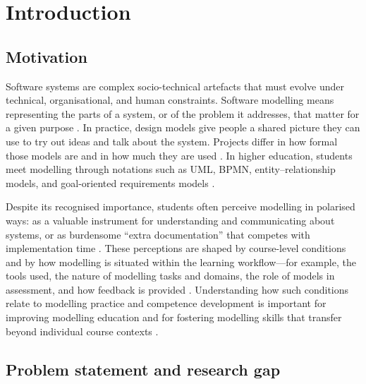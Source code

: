 
%

\chapter{Introduction}
\label{cha:introduction}

\section{Motivation}
\label{sec:intro_motivation}

Software systems are complex socio-technical artefacts that must evolve under technical, organisational, and human constraints. Software modelling means representing the parts of a system, or of the problem it addresses, that matter for a given purpose \cite{kuhne:DagSemProc.04101.15}. In practice, design models give people a shared picture they can use to try out ideas and talk about the system. Projects differ in how formal those models are and in how much they are used \cite{gorschek2014design,petre2013uml}. In higher education, students meet modelling through notations such as UML, BPMN, entity--relationship models, and goal-oriented requirements models \cite{istar-learning,bpmn-education,maslov2025conceptual}.

Despite its recognised importance, students often perceive modelling in polarised ways: as a valuable instrument for understanding and communicating about systems, or as burdensome ``extra documentation'' that competes with implementation time \cite{chakraborty2022perceptions,grassl2026dei,liebel2017model}. These perceptions are shaped by course-level conditions and by how modelling is situated within the learning workflow---for example, the tools used, the nature of modelling tasks and domains, the role of models in assessment, and how feedback is provided \cite{grassl2026dei,liebel2017model}. Understanding how such conditions relate to modelling practice and competence development is important for improving modelling education and for fostering modelling skills that transfer beyond individual course contexts \cite{maslov2025conceptual}.


\section{Problem statement and research gap}
\label{sec:intro_gap}

